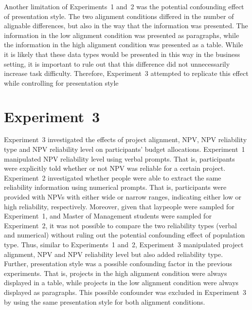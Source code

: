 \documentclass[a4paper, nobind]{templates/ociamthesis}
\theoremstyle{definition}
\theoremstyle{definition}
\theoremstyle{definition}
\theoremstyle{definition}
\theoremstyle{remark}
\begin{document}
Another limitation of Experiments~1 and~2 was the potential confounding effect
of presentation style. The two alignment conditions differed in the number of
alignable differences, but also in the way that the information was presented.
The information in the low alignment condition was presented as paragraphs,
while the information in the high alignment condition was presented as a table.
While it is likely that these data types would be presented in this way in the
business setting, it is important to rule out that this difference did not
unnecessarily increase task difficulty. Therefore, Experiment~3 attempted to
replicate this effect while controlling for presentation style

\hypertarget{alignment-8}{%
\section{Experiment~3}\label{alignment-8}}

Experiment~3 investigated the effects of project alignment, NPV, NPV reliability
type and NPV reliability level on participants' budget allocations. Experiment~1
manipulated NPV reliability level using verbal prompts. That is, participants
were explicitly told whether or not NPV was reliable for a certain project.
Experiment~2 investigated whether people were able to extract the same
reliability information using numerical prompts. That is, participants were
provided with NPVs with either wide or narrow ranges, indicating either low or
high reliability, respectively. Moreover, given that laypeople were sampled for
Experiment~1, and Master of Management students were sampled for Experiment~2,
it was not possible to compare the two reliability types (verbal and numerical)
without ruling out the potential confounding effect of population type. Thus,
similar to Experiments~1 and~2, Experiment~3 manipulated project alignment, NPV
and NPV reliability level but also added reliability type. Further, presentation
style was a possible confounding factor in the previous experiments. That is,
projects in the high alignment condition were always displayed in a table, while
projects in the low alignment condition were always displayed as paragraphs.
This possible confounder was excluded in Experiment~3 by using the same
presentation style for both alignment conditions.
\end{document}
